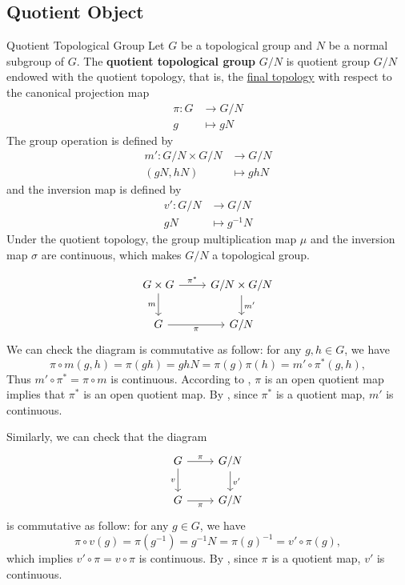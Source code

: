 \documentclass{report}
\begin{document}
\subsection{Quotient Object}
\begin{definition}{Quotient Topological Group}{}
	Let $G$ be a topological group and $N$ be a normal subgroup of $G$. The \textbf{quotient topological group} $G/N$ is quotient group $G/N$ endowed with the quotient topology, that is, the \hyperref[th:final_topology]{final topology} with respect to the canonical projection map
	\begin{align*}
		\pi:G & \longrightarrow G/N \\
		g     & \longmapsto gN
	\end{align*}
	The group operation is  defined by
	\begin{align*}
		m':G/N\times G/N & \longrightarrow G/N \\
		(gN,hN)           & \longmapsto ghN
	\end{align*}
	and the inversion map is defined by
	\begin{align*}
		v':G/N & \longrightarrow G/N \\
		gN         & \longmapsto g^{-1}N
	\end{align*}
	Under the quotient topology, the group multiplication map $\mu$ and the inversion map $\sigma$ are continuous, which makes $G/N$ a topological group.
\end{definition}
\begin{remark}
	\[
	\begin{tikzcd}
		G\times G \arrow[r, "\pi^*"] \arrow[d, "m"'] & G/N\times G/N \arrow[d, "m'"] \\
		G \arrow[r, "\pi"']                          & G/N                          
	\end{tikzcd}
	\]
	We can check the diagram is commutative as follow: for any $g,h\in G$, we have
	\[
	 \pi\circ m(g,h)=\pi(gh)=ghN=\pi(g)\pi(h)=m'\circ\pi^*(g,h),
	\]
	Thus $m'\circ \pi^*=\pi\circ m$ is continuous. According to , $\pi$ is an open quotient map implies that $\pi^*$ is an open quotient map. By , since $\pi^*$ is a quotient map, $m'$ is continuous.

	Similarly, we can check that the diagram
	\[
	\begin{tikzcd}
		G \arrow[r, "\pi"] \arrow[d, "v"'] & G/N \arrow[d, "v'"] \\
		G \arrow[r, "\pi"']               & G/N
	\end{tikzcd}
	\]
	is commutative as follow: for any $g\in G$, we have
	\[
	 \pi\circ v(g)=\pi(g^{-1})=g^{-1}N=\pi(g)^{-1}=v'\circ \pi(g),
	\]
	which implies $v'\circ \pi=v\circ \pi$ is continuous. By , since $\pi$ is a quotient map, $v'$ is continuous.
\end{remark}
\end{document}
